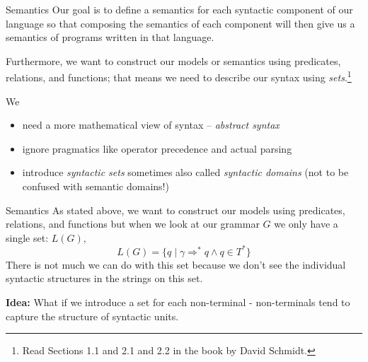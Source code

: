 \documentclass{beamer}
\begin{document}

\begin{frame}{Semantics}
Our goal is to define a semantics
for each syntactic component of our language so that composing the semantics of each component
will then give us a semantics of programs written in that language.

\vspace{.1in}
Furthermore,
we want to construct our models or semantics using predicates, relations, and functions; that means
we need to describe our syntax using {\em sets}.\footnote{\tiny Read Sections 1.1 and 2.1 and 2.2 in the book by David Schmidt.}

\vspace{.1in}

We
\begin{itemize}
\item need a more mathematical view of syntax -- {\em abstract syntax}
\item ignore pragmatics like operator precedence and actual  parsing
\item introduce  {\em syntactic sets} sometimes also called {\em syntactic domains}  (not to be confused with semantic domains!)
\end{itemize}

\end{frame}


\begin{frame}{Semantics}
As stated above, we want to construct our models using predicates, relations, and functions but when we look at our grammar $G$
we only have a single set: $L(G)$,
\[
L(G) = \{ q \mid \gamma \Rightarrow^* q \wedge q \in T^*\}
\]
There is not much we can do with this set because we don't see the individual syntactic structures in the strings on this set.

\vspace{.1in}

{\bf Idea:} What if we introduce a set for each non-terminal - non-terminals tend to capture the structure of syntactic units.
\end{frame}
\end{document}
